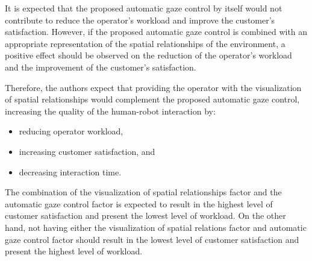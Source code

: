 \documentclass[a4paper, 10pt, conference]{ieeeconf}     %
\begin{document}
It is expected that the proposed automatic gaze control by itself would not contribute to reduce the operator's workload and improve the customer's satisfaction.
However, if the proposed automatic gaze control is combined with an appropriate representation of the spatial relationships of the environment, a positive effect should be observed on the reduction of the operator's workload and the improvement of the customer's satisfaction.

Therefore, the authors expect that providing the operator with the visualization of spatial relationships would complement the proposed automatic gaze control, increasing the quality of the human-robot interaction by:
\begin{itemize}
	\item reducing operator workload,
	\item increasing customer satisfaction, and
	\item decreasing interaction time.
\end{itemize}
The combination of the visualization of spatial relationships factor and the automatic gaze control factor is expected to result in the highest level of customer satisfaction and present the lowest level of workload.
On the other hand, not having either the visualization of spatial relations factor and automatic gaze control factor should result in the lowest level of customer satisfaction and present the highest level of workload.
\end{document}
